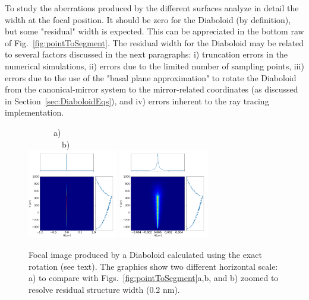 \documentclass{iucr}              %
\begin{document}
To study the aberrations produced by the different surfaces analyze in detail the width at the focal position. It should be zero for the Diaboloid (by definition), but some "residual" width is expected. This can be appreciated in the bottom raw of Fig.~\ref{fig:pointToSegment}. The residual width for the Diaboloid may be related to several factors discussed in the next paragraphs: i) truncation errors in the numerical simulations, ii) errors due to the limited number of sampling points, iii) errors due to the use of the "basal plane approximation" to rotate the Diaboloid from the canonical-mirror system to the mirror-related coordinates (as discussed in Section~\ref{sec:DiaboloidEqs}), and iv) errors inherent to the ray tracing implementation. 

\begin{figure}[h]
\flushleft
~~~~~~a)~~~~~~~~~~~~~~~~~~~~~~~~~~~~~~~~~~~~~~~~~~~~~~~~~~~~~~~~~~~~b)\\
\centering
\includegraphics[width=0.35\textwidth]{figures/p2s_mathematica1.png}
\includegraphics[width=0.35\textwidth]{figures/p2s_matematica2.png}
\caption{\label{fig:mathematica}Focal image produced by a Diaboloid calculated using the exact rotation (see text). The graphics show two different horizontal scale: a) to compare with Figs.~\ref{fig:pointToSegment}a,b, and b) zoomed to resolve residual structure width (0.2 nm).
}
\end{figure}


\end{document}
